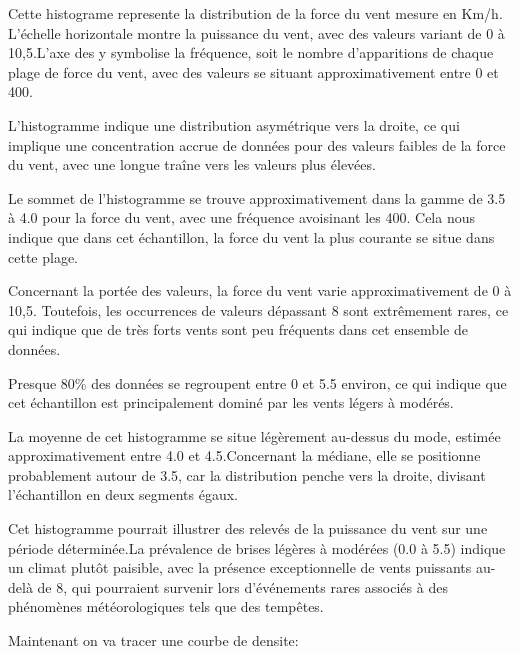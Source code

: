 \documentclass[
]{article}
\begin{document}
Cette histograme represente la distribution de la force du vent mesure
en Km/h. L'échelle horizontale montre la puissance du vent, avec des
valeurs variant de 0 à 10,5.L'axe des y symbolise la fréquence, soit le
nombre d'apparitions de chaque plage de force du vent, avec des valeurs
se situant approximativement entre 0 et 400.

L'histogramme indique une distribution asymétrique vers la droite, ce
qui implique une concentration accrue de données pour des valeurs
faibles de la force du vent, avec une longue traîne vers les valeurs
plus élevées.

Le sommet de l'histogramme se trouve approximativement dans la gamme de
3.5 à 4.0 pour la force du vent, avec une fréquence avoisinant les 400.
Cela nous indique que dans cet échantillon, la force du vent la plus
courante se situe dans cette plage.

Concernant la portée des valeurs, la force du vent varie
approximativement de 0 à 10,5. Toutefois, les occurrences de valeurs
dépassant 8 sont extrêmement rares, ce qui indique que de très forts
vents sont peu fréquents dans cet ensemble de données.

Presque 80\% des données se regroupent entre 0 et 5.5 environ, ce qui
indique que cet échantillon est principalement dominé par les vents
légers à modérés.

La moyenne de cet histogramme se situe légèrement au-dessus du mode,
estimée approximativement entre 4.0 et 4.5.Concernant la médiane, elle
se positionne probablement autour de 3.5, car la distribution penche
vers la droite, divisant l'échantillon en deux segments égaux.

Cet histogramme pourrait illustrer des relevés de la puissance du vent
sur une période déterminée.La prévalence de brises légères à modérées
(0.0 à 5.5) indique un climat plutôt paisible, avec la présence
exceptionnelle de vents puissants au-delà de 8, qui pourraient survenir
lors d'événements rares associés à des phénomènes météorologiques tels
que des tempêtes.

Maintenant on va tracer une courbe de densite:
\end{document}
